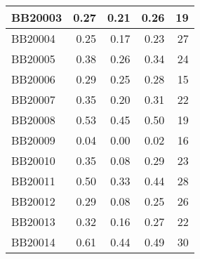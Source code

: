 \begin{longtable}{|l|r|r|r||r|}
	\hline
	BB20003 & \cellcolor[rgb]{ .988,  1,  .992}0.27 & \cellcolor[rgb]{ .384,  .745,  .478}0.21 & \cellcolor[rgb]{ .859,  .945,  .882}0.26 & \cellcolor[rgb]{ .98,  .624,  .635}19 \\
	\hline
	BB20004 & \cellcolor[rgb]{ .988,  1,  .992}0.25 & \cellcolor[rgb]{ .384,  .745,  .478}0.17 & \cellcolor[rgb]{ .851,  .941,  .875}0.23 & \cellcolor[rgb]{ .976,  .471,  .478}27 \\
	\hline
	BB20005 & \cellcolor[rgb]{ .988,  1,  .992}0.38 & \cellcolor[rgb]{ .384,  .745,  .478}0.26 & \cellcolor[rgb]{ .788,  .914,  .824}0.34 & \cellcolor[rgb]{ .976,  .529,  .537}24 \\
	\hline
	BB20006 & \cellcolor[rgb]{ .988,  1,  .992}0.29 & \cellcolor[rgb]{ .384,  .745,  .478}0.25 & \cellcolor[rgb]{ .784,  .914,  .82}0.28 & \cellcolor[rgb]{ .98,  .702,  .71}15 \\
	\hline
	BB20007 & \cellcolor[rgb]{ .988,  1,  .992}0.35 & \cellcolor[rgb]{ .384,  .745,  .478}0.20 & \cellcolor[rgb]{ .82,  .929,  .851}0.31 & \cellcolor[rgb]{ .98,  .569,  .576}22 \\
	\hline
	BB20008 & \cellcolor[rgb]{ .988,  1,  .992}0.53 & \cellcolor[rgb]{ .384,  .745,  .478}0.45 & \cellcolor[rgb]{ .78,  .91,  .816}0.50 & \cellcolor[rgb]{ .98,  .624,  .635}19 \\
	\hline
	BB20009 & \cellcolor[rgb]{ .988,  1,  .992}0.04 & \cellcolor[rgb]{ .384,  .745,  .478}0.00 & \cellcolor[rgb]{ .647,  .855,  .702}0.02 & \cellcolor[rgb]{ .98,  .682,  .694}16 \\
	\hline
	BB20010 & \cellcolor[rgb]{ .988,  1,  .992}0.35 & \cellcolor[rgb]{ .384,  .745,  .478}0.08 & \cellcolor[rgb]{ .871,  .949,  .89}0.29 & \cellcolor[rgb]{ .976,  .549,  .557}23 \\
	\hline
	BB20011 & \cellcolor[rgb]{ .988,  1,  .992}0.50 & \cellcolor[rgb]{ .384,  .745,  .478}0.33 & \cellcolor[rgb]{ .784,  .914,  .82}0.44 & \cellcolor[rgb]{ .976,  .451,  .459}28 \\
	\hline
	BB20012 & \cellcolor[rgb]{ .988,  1,  .992}0.29 & \cellcolor[rgb]{ .384,  .745,  .478}0.08 & \cellcolor[rgb]{ .851,  .941,  .875}0.25 & \cellcolor[rgb]{ .976,  .49,  .498}26 \\
	\hline
	BB20013 & \cellcolor[rgb]{ .988,  1,  .992}0.32 & \cellcolor[rgb]{ .384,  .745,  .478}0.16 & \cellcolor[rgb]{ .816,  .925,  .843}0.27 & \cellcolor[rgb]{ .98,  .569,  .576}22 \\
	\hline
	BB20014 & \cellcolor[rgb]{ .988,  1,  .992}0.61 & \cellcolor[rgb]{ .384,  .745,  .478}0.44 & \cellcolor[rgb]{ .565,  .82,  .631}0.49 & \cellcolor[rgb]{ .973,  .412,  .42}30 \\

\end{longtable}
